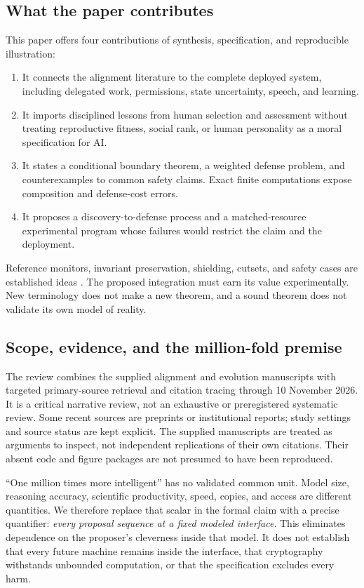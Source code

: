 \documentclass[10pt,twocolumn,letterpaper]{article}
\begin{document}
\subsection{What the paper contributes}
This paper offers four contributions of synthesis, specification, and reproducible illustration:
\begin{enumerate}
\item It connects the alignment literature to the complete deployed system, including delegated work, permissions, state uncertainty, speech, and learning.
\item It imports disciplined lessons from human selection and assessment without treating reproductive fitness, social rank, or human personality as a moral specification for AI.
\item It states a conditional boundary theorem, a weighted defense problem, and counterexamples to common safety claims. Exact finite computations expose composition and defense-cost errors.
\item It proposes a discovery-to-defense process and a matched-resource experimental program whose failures would restrict the claim and the deployment.
\end{enumerate}
Reference monitors, invariant preservation, shielding, cutsets, and safety cases are established ideas \cite{saltzer,schneider,shield,containment}. The proposed integration must earn its value experimentally. New terminology does not make a new theorem, and a sound theorem does not validate its own model of reality.

\subsection{Scope, evidence, and the million-fold premise}
The review combines the supplied alignment and evolution manuscripts with targeted primary-source retrieval and citation tracing through 10 November 2026. It is a critical narrative review, not an exhaustive or preregistered systematic review. Some recent sources are preprints or institutional reports; study settings and source status are kept explicit. The supplied manuscripts are treated as arguments to inspect, not independent replications of their own citations. Their absent code and figure packages are not presumed to have been reproduced.

``One million times more intelligent'' has no validated common unit. Model size, reasoning accuracy, scientific productivity, speed, copies, and access are different quantities. We therefore replace that scalar in the formal claim with a precise quantifier: \emph{every proposal sequence at a fixed modeled interface}. This eliminates dependence on the proposer's cleverness inside that model. It does not establish that every future machine remains inside the interface, that cryptography withstands unbounded computation, or that the specification excludes every harm.
\end{document}
